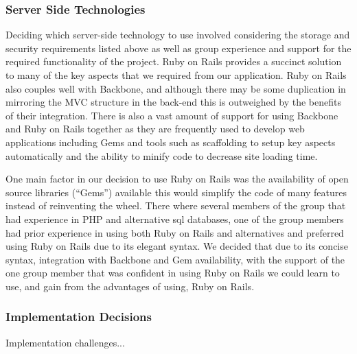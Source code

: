 	\subsubsection{Server Side Technologies}
		Deciding which server-side technology to use involved considering the storage and security requirements listed above as well as group experience and support for the required functionality of the project. Ruby on Rails provides a succinct solution to many of the key aspects that we required from our application. Ruby on Rails also couples well with Backbone, and although there may be some duplication in mirroring the MVC structure in the back-end this is outweighed by the benefits of their integration. There is also a vast amount of support for using Backbone and Ruby on Rails together as they are frequently used to develop web applications including Gems and tools such as scaffolding to setup key aspects automatically and the ability to minify code to decrease site loading time.
		
		One main factor in our decision to use Ruby on Rails was the availability of open source libraries (``Gems'') available this would simplify the code of many features instead of reinventing the wheel.
		There where several members of the group that had experience in PHP and alternative sql databases, one of the group members had prior experience in using both Ruby on Rails and alternatives and preferred using Ruby on Rails due to its elegant syntax. We decided that due to its concise syntax, integration with Backbone and Gem availability, with the support of the one group member that was confident in using Ruby on Rails we could learn to use, and gain from the advantages of using, Ruby on Rails.
	
	\subsubsection{Implementation Decisions}
		Implementation challenges...